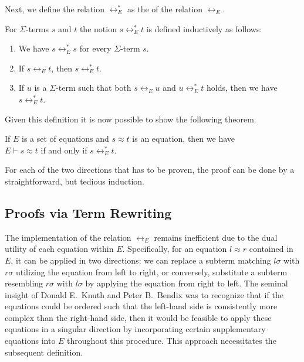 Next, we define the relation $\leftrightarrow_E^*$ as the  of the relation
$\leftrightarrow_E$.
\begin{Definition}[$\leftrightarrow_E^*$]
  For $\Sigma$-terms $s$ and $t$ the notion $s \leftrightarrow_E^* t$ is defined inductively as follows:
  \begin{enumerate}
  \item We have $s \leftrightarrow_E^* s$ for every $\Sigma$-term $s$.
  \item If $s \leftrightarrow_E t$, then $s \leftrightarrow_E^* t$.
  \item If $u$ is a $\Sigma$-term such that both $s \leftrightarrow_E u$ and $u \leftrightarrow_E^* t$ holds,
        then we have $s \leftrightarrow_E^* t$. \eod
  \end{enumerate}
\end{Definition}

\noindent
Given this definition it is now possible to show the following theorem.

\begin{Theorem}
  If $E$ is a set of equations and $s \approx t$ is an equation, then we have
  \\[0.2cm]
  \hspace*{1.3cm}
  $E \vdash s \approx t$ \quad if and only if \quad $s \leftrightarrow_E^* t$.
\end{Theorem}
For each of the two directions that has to be proven, the proof can be done by a straightforward, but tedious
induction. 

\subsection{Proofs via Term Rewriting}
The implementation of the relation $\leftrightarrow_E$ remains inefficient due to the dual utility of each
equation within $E$. Specifically, for an equation $l \approx r$ contained in $E$, it can be applied in two
directions: we can replace a subterm matching $l\sigma$ with $r\sigma$ utilizing the equation from left to
right, or conversely, substitute a subterm resembling $r\sigma$ with $l\sigma$ by applying the equation from
right to left.  
The seminal insight of Donald E.~Knuth and Peter B.~Bendix
\cite{knuth:1970} was to recognize that if the equations could be ordered such that the left-hand side is
consistently more complex than the right-hand side, then it would be feasible to apply these equations in a
singular direction by incorporating certain supplementary equations into $E$ throughout this procedure. This
approach necessitates the subsequent definition. 

